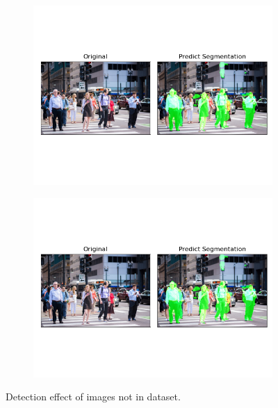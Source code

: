 \documentclass[12pt, a4paper]{article}
\begin{document}
\begin{multicols}{2}
	\begin{figure}[h!]
	  \centering
	  \begin{subfigure}[b]{0.45\linewidth}
	    \includegraphics[width=\linewidth]{predict1.png}
	  \end{subfigure}
	  \begin{subfigure}[b]{0.45\linewidth}
	    \includegraphics[width=\linewidth]{predict1.png}
	  \end{subfigure}
	  \caption{Detection effect of images not in dataset.}
	  \label{fig:result2}
	\end{figure}


\end{multicols}
\end{document}
